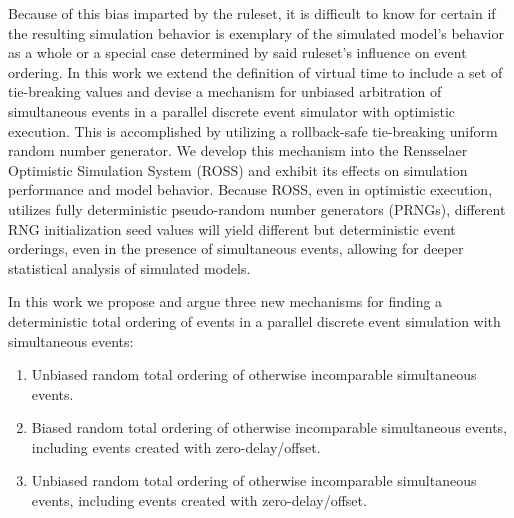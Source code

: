\documentclass[nonacm,sigconf]{acmart}
\begin{document}
Because of this bias imparted by the ruleset, it is difficult to know for certain if the resulting simulation behavior is exemplary of the simulated model's behavior as a whole or a special case determined by said ruleset's influence on event ordering. In this work we extend the definition of virtual time to include a set of tie-breaking values and devise a mechanism for unbiased arbitration of simultaneous events in a parallel discrete event simulator with optimistic execution. This is accomplished by utilizing a rollback-safe tie-breaking uniform random number generator. We develop this mechanism into the Rensselaer Optimistic Simulation System (ROSS) and exhibit its effects on simulation performance and model behavior. Because ROSS, even in optimistic execution, utilizes fully deterministic pseudo-random number generators (PRNGs), different RNG initialization seed values will yield different but deterministic event orderings, even in the presence of simultaneous events, allowing for deeper statistical analysis of simulated models.

In this work we propose and argue three new mechanisms for finding a deterministic total ordering of events in a parallel discrete event simulation with simultaneous events:

\begin{enumerate}
  \item Unbiased random total ordering of otherwise incomparable simultaneous events.
  \item Biased random total ordering of otherwise incomparable simultaneous events, including events created with zero-delay/offset.
  \item Unbiased random total ordering of otherwise incomparable simultaneous events, including events created with zero-delay/offset.
\end{enumerate}

\end{document}
